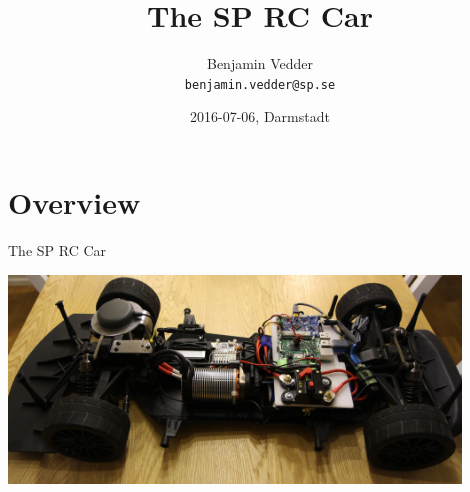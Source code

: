 \documentclass[aspectratio=169,electronics,notopline]{beamer}
\title{The SP RC Car}
\author[Euclid]{Benjamin Vedder\\
\texttt{benjamin.vedder@sp.se}}
\date{2016-07-06, Darmstadt}
\begin{document}
\spStartFrame
\maketitle


\section{Overview}

\begin{frame}{The SP RC Car}
\begin{center}
	\includegraphics[width=12cm]{Figures/car_2.jpg}
\end{center}
\end{frame}
\end{document}
